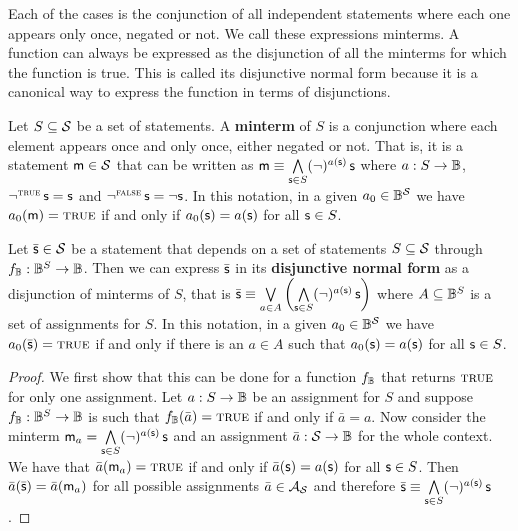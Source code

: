 \documentclass[11pt,letterpaper,fleqn]{memoir} %
\begin{document}

Each of the cases is the conjunction of all independent statements where each one appears only once, negated or not. We call these expressions minterms. A function can always be expressed as the disjunction of all the minterms for which the function is true. This is called its disjunctive normal form because it is a canonical way to express the function in terms of disjunctions.

\begin{mathSection}
\begin{defn}\label{def_minterm}
	Let $S \subseteq \logCtx$ be a set of statements. A \textbf{minterm} of $S$ is a conjunction where each element appears once and only once, either negated or not. That is, it is a statement $\stmt[m] \in \logCtx$ that can be written as $\stmt[m] \equiv \bigAND \limits_{\stmt \in S} (\NOT)^{a(\stmt)} \, \stmt$ where $a : S \to \Bool$, $\NOT ^ \TRUE \, \stmt = \stmt$ and $\NOT ^ \FALSE \, \stmt = \NOT \stmt$. In this notation, in a given $a_0 \in \Bool^\logCtx$ we have $a_0(\stmt[m]) = \TRUE$ if and only if $a_0(\stmt) = a(\stmt)$ for all $\stmt \in S$.
\end{defn}
	
	\begin{prop}\label{prop_disjunctive_normal_form}
		Let $\bar{\stmt} \in \logCtx$ be a statement that depends on a set of statements $S \subseteq \logCtx$ through $f_\Bool : \Bool^S \to \Bool$. Then we can express $\bar{\stmt}$ in its \textbf{disjunctive normal form} as a disjunction of minterms of $S$, that is $\bar{\stmt} \equiv \bigOR \limits_{a \in A} \left( \bigAND \limits_{\stmt \in S} (\NOT)^{a(\stmt)} \, \stmt \right)$ where $A \subseteq \Bool^S$ is a set of assignments for $S$. In this notation, in a given $a_0 \in \Bool^\logCtx$ we have $a_0(\bar{\stmt}) = \TRUE$ if and only if there is an $a \in A$ such that $a_0(\stmt) = a(\stmt)$ for all $\stmt \in S$.
	\end{prop}
	\begin{proof}
		We first show that this can be done for a function $f_\Bool$ that returns $\TRUE$ for only one assignment. Let $a : S \to \Bool$ be an assignment for $S$ and suppose $f_\Bool: \Bool^S \to \Bool$ is such that $f_\Bool(\bar{a}) = \TRUE$ if and only if $\bar{a} = a$. Now consider the minterm $\stmt[m]_a = \bigAND \limits_{\stmt \in S} (\NOT)^{a(\stmt)} \, \stmt$ and an assignment $\bar{a} : \logCtx \to \Bool$ for the whole context. We have that $\bar{a}(\stmt[m]_a) = \TRUE$ if and only if $\bar{a}(\stmt) = a(\stmt)$ for all $\stmt \in S$. Then $\bar{a}(\bar{\stmt}) = \bar{a}(\stmt[m]_a)$ for all possible assignments $\bar{a} \in \pAss$ and therefore $\bar{\stmt} \equiv \bigAND \limits_{\stmt \in S} (\NOT)^{a(\stmt)} \, \stmt$.


\end{proof}
\end{mathSection}
\end{document}
